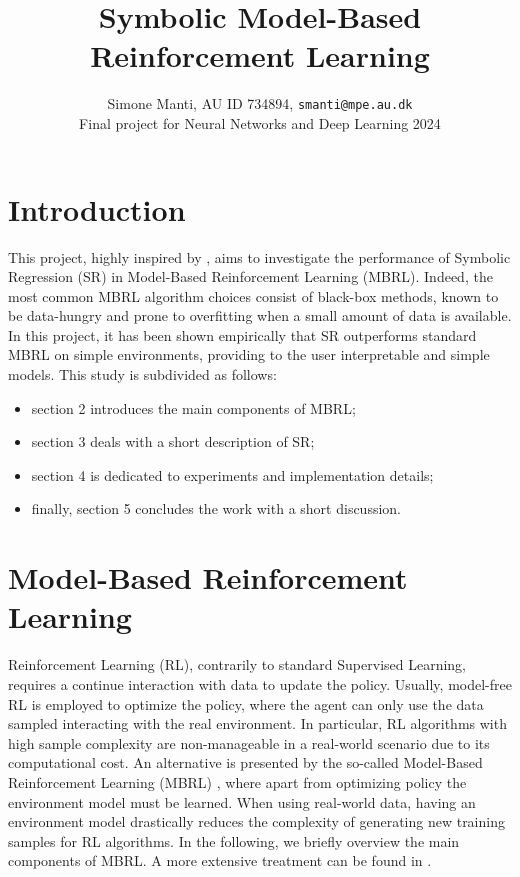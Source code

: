 \documentclass[11pt]{article}
\author{Simone Manti, AU ID 734894, \texttt{smanti@mpe.au.dk} \\
	Final project for Neural Networks and Deep Learning 2024}
\title{Symbolic Model-Based Reinforcement Learning}
\begin{document}
	\maketitle

\section{Introduction}
This project, highly inspired by \cite{kamienny2022symbolic}, aims to investigate the performance of Symbolic Regression (SR) in Model-Based Reinforcement Learning (MBRL). Indeed, the most common MBRL algorithm choices consist of black-box methods, known to be data-hungry and prone to overfitting when a small amount of data is available.
In this project, it has been shown empirically that SR outperforms standard MBRL on simple environments, providing to the user interpretable and simple models.
This study is subdivided as follows:
\begin{itemize}
	\item section 2 introduces the main components of MBRL;
	\item section 3 deals with a short description of SR;
	\item section 4 is dedicated to experiments and implementation details;
	\item finally, section 5 concludes the work with a short discussion. 
\end{itemize}

\section{Model-Based Reinforcement Learning}
Reinforcement Learning (RL), contrarily to standard Supervised Learning, requires a continue interaction with data to update the policy. Usually, model-free RL is employed to optimize the policy, where the agent can only use the data sampled interacting with the real environment. In particular, RL algorithms with high sample complexity are non-manageable in a real-world scenario due to its computational cost. An alternative is presented by the so-called Model-Based Reinforcement Learning (MBRL) \cite{moerland2023model}, where apart from optimizing policy the environment model must be learned. When using real-world data, having an environment model drastically reduces the complexity of generating new training samples for RL algorithms.
In the following, we briefly overview the main components of MBRL. A more extensive treatment can be found in \cite{moerland2023model, pineda2021mbrl,luo2024survey}. 
\end{document}
